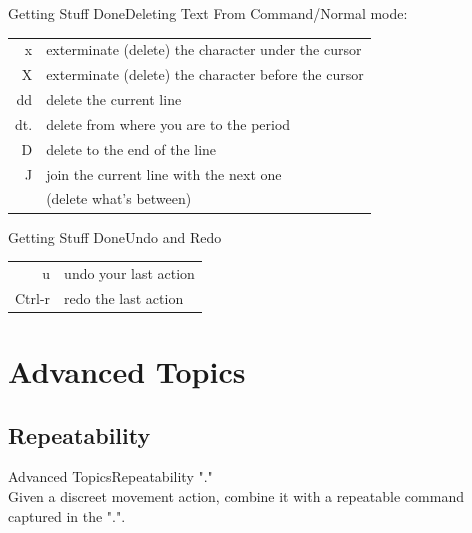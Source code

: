 \documentclass{beamer}
\begin{document}
\begin{frame}[c]{Getting Stuff Done}{Deleting Text}
    From Command/Normal mode:
    \begin{table}[htpb]
        \centering
        \begin{tabular}{r|l}
            x    & exterminate (delete) the character under the cursor \\
            X    & exterminate (delete) the character before the cursor \\
            dd   & delete the current line \\
            dt.  & delete from where you are to the period \\
            D    & delete to the end of the line \\
            J    & join the current line with the next one \\
                 & (delete what's between) \\
        \end{tabular}
    \end{table}
\end{frame}


\begin{frame}[c]{Getting Stuff Done}{Undo and Redo}
    \begin{table}[htpb]
        \centering
        \begin{tabular}{r|l}
            u      & undo your last action \\
            Ctrl-r & redo the last action \\
        \end{tabular}
    \end{table}
\end{frame}


\section{Advanced Topics}

\subsection{Repeatability}
\begin{frame}[c]{Advanced Topics}{Repeatability}
    \centering
    "." \\
    \vspace{1cm}
    Given a discreet movement action, combine it with a repeatable command captured in the ".".
\end{frame}
\end{document}
